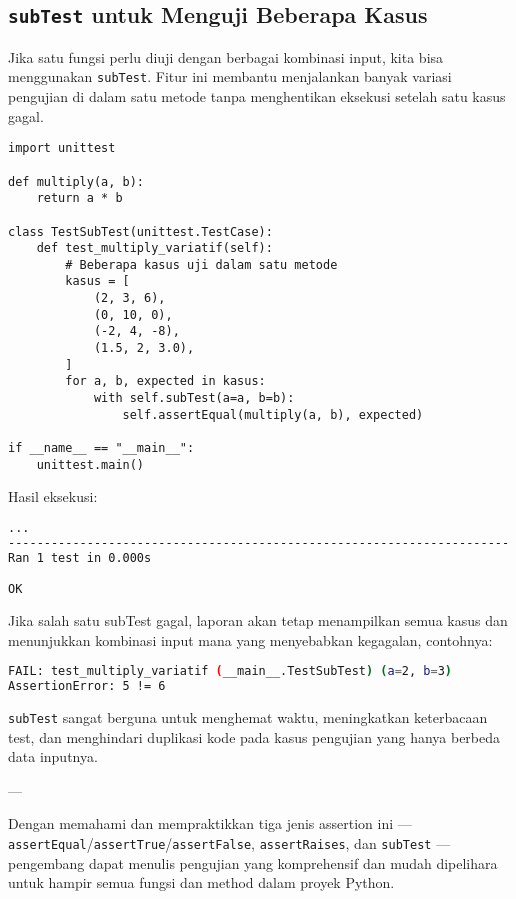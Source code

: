 \subsection{\texttt{subTest} untuk Menguji Beberapa Kasus}

Jika satu fungsi perlu diuji dengan berbagai kombinasi input, kita bisa menggunakan \texttt{subTest}.  
Fitur ini membantu menjalankan banyak variasi pengujian di dalam satu metode tanpa menghentikan eksekusi setelah satu kasus gagal.

\begin{lstlisting}[style=PythonStyle, caption={Penggunaan subTest untuk beberapa kasus input}, label={lst:subtest}]
import unittest

def multiply(a, b):
    return a * b

class TestSubTest(unittest.TestCase):
    def test_multiply_variatif(self):
        # Beberapa kasus uji dalam satu metode
        kasus = [
            (2, 3, 6),
            (0, 10, 0),
            (-2, 4, -8),
            (1.5, 2, 3.0),
        ]
        for a, b, expected in kasus:
            with self.subTest(a=a, b=b):
                self.assertEqual(multiply(a, b), expected)

if __name__ == "__main__":
    unittest.main()
\end{lstlisting}

Hasil eksekusi:

\begin{lstlisting}[language=bash]
...
----------------------------------------------------------------------
Ran 1 test in 0.000s

OK
\end{lstlisting}

Jika salah satu subTest gagal, laporan akan tetap menampilkan semua kasus dan menunjukkan kombinasi input mana yang menyebabkan kegagalan, contohnya:

\begin{lstlisting}[language=bash]
FAIL: test_multiply_variatif (__main__.TestSubTest) (a=2, b=3)
AssertionError: 5 != 6
\end{lstlisting}

\texttt{subTest} sangat berguna untuk menghemat waktu, meningkatkan keterbacaan test, dan menghindari duplikasi kode pada kasus pengujian yang hanya berbeda data inputnya.

---

Dengan memahami dan mempraktikkan tiga jenis assertion ini — \texttt{assertEqual}/\texttt{assertTrue}/\texttt{assertFalse}, \texttt{assertRaises}, dan \texttt{subTest} — pengembang dapat menulis pengujian yang komprehensif dan mudah dipelihara untuk hampir semua fungsi dan method dalam proyek Python.


